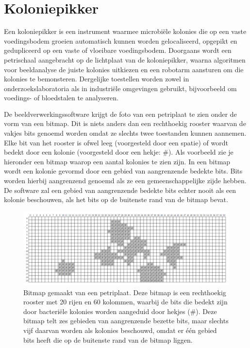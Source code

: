
\section*{Koloniepikker}
Een koloniepikker is een instrument waarmee microbi\"ele kolonies die op een
vaste voedingsbodem groeien automatisch kunnen worden gelocaliseerd, opgepikt
en gedupliceerd op een vaste of vloeibare voedingsbodem. Doorgaans wordt een
petrischaal aangebracht op de lichtplaat van de koloniepikker, waarna
algoritmen voor beeldanalyse de juiste kolonies uitkiezen en een robotarm
aansturen om die kolonies te bemonsteren. Dergelijke toestellen worden zowel in
onderzoekslaboratoria als in industri\"ele omgevingen gebruikt, bijvoorbeeld om
voedings- of bloedstalen te analyseren.

De beeldverwerkingssoftware krijgt de foto van een petriplaat te zien onder de
vorm van een bitmap. Dit is niets anders dan een rechthoekig rooster waarvan de
vakjes bits genoemd worden omdat ze slechts twee toestanden kunnen aannemen.
Elke bit van het rooster is ofwel leeg (voorgesteld door een spatie) of wordt
bedekt door een kolonie (voorgesteld door een hekje: \#). Als voorbeeld zie je
hieronder een bitmap waarop een aantal kolonies te zien zijn. In een bitmap
wordt een kolonie gevormd door een gebied van aangrenzende bedekte bits. Bits
worden hierbij aangrenzend genoemd als ze een gemeenschappelijke zijde hebben.
De software zal een gebied van aangrenzende bedekte bits echter nooit als een
kolonie beschouwen, als het bits op de buitenste rand van de bitmap bevat.

\begin{figure}[H]
  \begin{center}
    \centerline{\includegraphics[scale=0.30]{koloniepikker/colony_bitmap.png}}
    \caption{Bitmap gemaakt van een petriplaat. Deze bitmap is een rechthoekig
        rooster met 20 rijen en 60 kolommen, waarbij de bits die bedekt zijn
        door bacteri\"ele kolonies worden aangeduid door hekjes (\#). Deze
        bitmap telt zes gebieden van aangrenzende bezette bits, maar slechts
        vijf daarvan worden als kolonies beschouwd, omdat er \'e\'en gebied bits
        heeft die op de buitenste rand van de bitmap liggen.}
  \end{center}
\end{figure}

